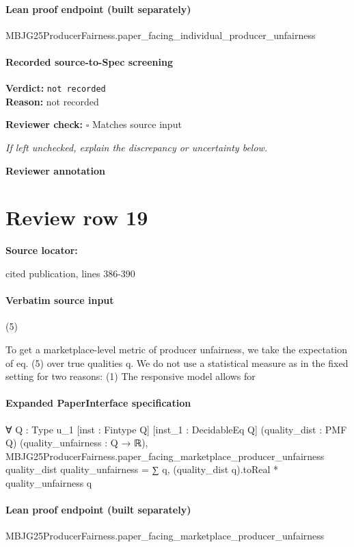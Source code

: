 \documentclass[10pt]{article}
\newcommand{\reviewerbox}{%
  \par\noindent\fbox{\parbox{0.96\linewidth}{\rule{0pt}{0.38in}}}\par
}
\newcommand{\reviewmatch}[1]{%
  \par\noindent\textbf{Reviewer check:} $\square$\; #1\par
  \noindent\emph{If left unchecked, explain the discrepancy or uncertainty below.}\par
}
\begin{document}
\paragraph{Lean proof endpoint (built separately)}\begin{ReviewVerbatim}
MBJG25ProducerFairness.paper_facing_individual_producer_unfairness
\end{ReviewVerbatim}

\paragraph{Recorded source-to-Spec screening}
\textbf{Verdict:} \texttt{not recorded}
\\
\textbf{Reason:} not recorded
\reviewmatch{Matches source input}
\noindent\textbf{Reviewer annotation}\par
\reviewerbox
\clearpage
\hypertarget{source-claim-aace03b9ed863bb2}{}
\section*{Review row 19}
\textbf{Source locator:} {\footnotesize\raggedright cited publication, lines 386-\allowbreak{}390\par}
\paragraph{Verbatim source input}
\begin{ReviewVerbatim}
(5)

To get a marketplace-level metric of producer unfairness,
we take the expectation of eq. (5) over true qualities q.
We do not use a statistical measure as in the fixed setting for two reasons: (1) The responsive model allows for
\end{ReviewVerbatim}


\paragraph{Expanded PaperInterface specification}
\begin{ReviewVerbatim}
∀ {Q : Type u_1} [inst : Fintype Q] [inst_1 : DecidableEq Q] (quality_dist : PMF Q) (quality_unfairness : Q → ℝ),
  MBJG25ProducerFairness.paper_facing_marketplace_producer_unfairness quality_dist quality_unfairness =
    ∑ q, (quality_dist q).toReal * quality_unfairness q
\end{ReviewVerbatim}

\paragraph{Lean proof endpoint (built separately)}\begin{ReviewVerbatim}
MBJG25ProducerFairness.paper_facing_marketplace_producer_unfairness
\end{ReviewVerbatim}
\end{document}
